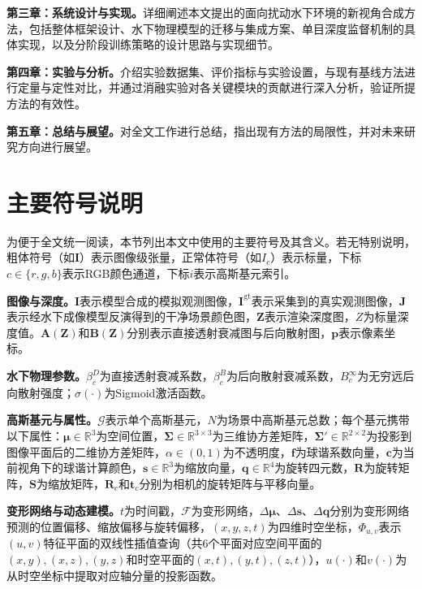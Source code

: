 \textbf{第三章：系统设计与实现。}详细阐述本文提出的面向扰动水下环境的新视角合成方法，包括整体框架设计、水下物理模型的迁移与集成方案、单目深度监督机制的具体实现，以及分阶段训练策略的设计思路与实现细节。

\textbf{第四章：实验与分析。}介绍实验数据集、评价指标与实验设置，与现有基线方法进行定量与定性对比，并通过消融实验对各关键模块的贡献进行深入分析，验证所提方法的有效性。

\textbf{第五章：总结与展望。}对全文工作进行总结，指出现有方法的局限性，并对未来研究方向进行展望。

\section{主要符号说明}
\label{sec:notation}

为便于全文统一阅读，本节列出本文中使用的主要符号及其含义。若无特别说明，粗体符号（如$\mathbf{I}$）表示图像级张量，正常体符号（如$I_c$）表示标量，下标$c\in\{r,g,b\}$表示RGB颜色通道，下标$i$表示高斯基元索引。

\textbf{图像与深度。}$\mathbf{I}$表示模型合成的模拟观测图像，$\mathbf{I}^{\mathrm{gt}}$表示采集到的真实观测图像，$\mathbf{J}$表示经水下成像模型反演得到的干净场景颜色图，$\mathbf{Z}$表示渲染深度图，$Z$为标量深度值。$\mathbf{A}(\mathbf{Z})$和$\mathbf{B}(\mathbf{Z})$分别表示直接透射衰减图与后向散射图，$\mathbf{p}$表示像素坐标。

\textbf{水下物理参数。}$\beta_c^D$为直接透射衰减系数，$\beta_c^B$为后向散射衰减系数，$B_c^{\infty}$为无穷远后向散射强度；$\sigma(\cdot)$为Sigmoid激活函数。

\textbf{高斯基元与属性。}$\mathcal{G}$表示单个高斯基元，$N$为场景中高斯基元总数；每个基元携带以下属性：$\boldsymbol{\mu}\in\mathbb{R}^3$为空间位置，$\boldsymbol{\Sigma}\in\mathbb{R}^{3\times3}$为三维协方差矩阵，$\boldsymbol{\Sigma}'\in\mathbb{R}^{2\times2}$为投影到图像平面后的二维协方差矩阵，$\alpha\in(0,1)$为不透明度，$\mathbf{f}$为球谐系数向量，$\mathbf{c}$为当前视角下的球谐计算颜色，$\mathbf{s}\in\mathbb{R}^3$为缩放向量，$\mathbf{q}\in\mathbb{R}^4$为旋转四元数，$\mathbf{R}$为旋转矩阵，$\mathbf{S}$为缩放矩阵，$\mathbf{R}_c$和$\mathbf{t}_c$分别为相机的旋转矩阵与平移向量。

\textbf{变形网络与动态建模。}$t$为时间戳，$\mathcal{F}$为变形网络，$\Delta\boldsymbol{\mu}$、$\Delta\mathbf{s}$、$\Delta\mathbf{q}$分别为变形网络预测的位置偏移、缩放偏移与旋转偏移，$(x,y,z,t)$为四维时空坐标，$\Phi_{u,v}$表示$(u,v)$特征平面的双线性插值查询（共6个平面对应空间平面的$(x,y),(x,z),(y,z)$和时空平面的$(x,t),(y,t),(z,t)$），$u(\cdot)$和$v(\cdot)$为从时空坐标中提取对应轴分量的投影函数。

